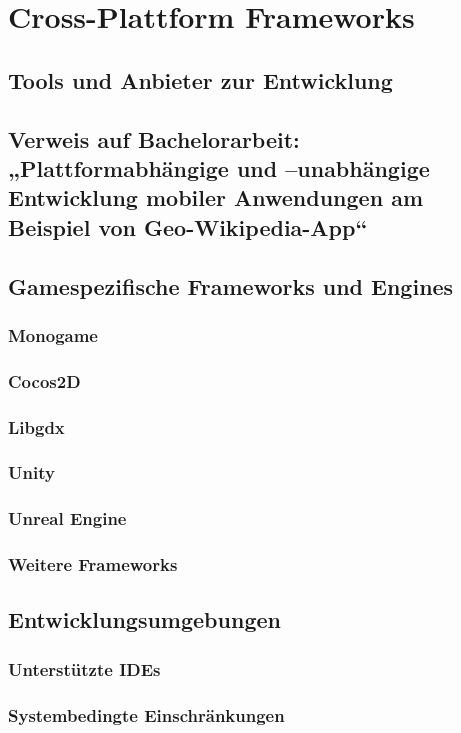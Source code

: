 \chapter{Cross-Plattform Frameworks}
\section{Tools und Anbieter zur Entwicklung}
\section{Verweis auf Bachelorarbeit: „Plattformabhängige und –unabhängige Entwicklung mobiler Anwendungen am Beispiel von Geo-Wikipedia-App“}
\section{Gamespezifische Frameworks und Engines}
\subsection{Monogame}
\subsection{Cocos2D}
\subsection{Libgdx}
\subsection{Unity}
\subsection{Unreal Engine}
\subsection{Weitere Frameworks}
\section{Entwicklungsumgebungen}
\subsection{Unterstützte IDEs}
\subsection{Systembedingte Einschränkungen}

